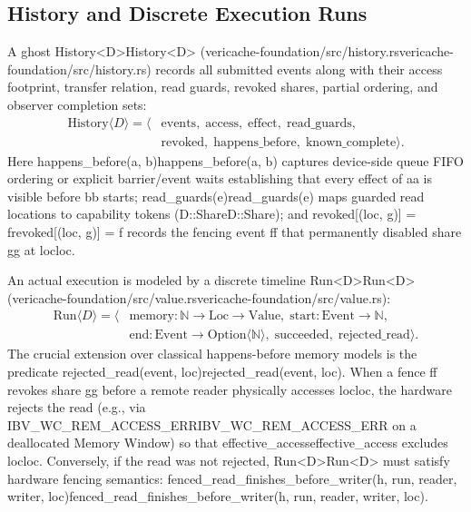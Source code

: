 \documentclass[11pt,a4paper]{article}
\let\origunderscore\_
\DeclareRobustCommand{\code}[1]{{\ttfamily\ifmmode #1\else\def\_{\origunderscore\hspace{0pt}}#1\fi}}
\begin{document}
\subsection{History and Discrete Execution Runs}

A ghost \code{History<D>} (\code{vericache-foundation/src/history.rs}) records all submitted events along with their access footprint, transfer relation, read guards, revoked shares, partial ordering, and observer completion sets:
\begin{align*}
  \mathrm{History}\langle D\rangle = \langle &\mathrm{events},\; \mathrm{access},\; \mathrm{effect},\; \mathrm{read\_guards}, \\
  &\mathrm{revoked},\; \mathrm{happens\_before},\; \mathrm{known\_complete} \rangle.
\end{align*}
Here \code{happens\_before(a, b)} captures device-side queue FIFO ordering or explicit barrier/event waits establishing that every effect of \code{a} is visible before \code{b} starts; \code{read\_guards(e)} maps guarded read locations to capability tokens (\code{D::Share}); and \code{revoked[(loc, g)] = f} records the fencing event \code{f} that permanently disabled share \code{g} at \code{loc}.

An actual execution is modeled by a discrete timeline \code{Run<D>} (\code{vericache-foundation/\allowbreak src/\allowbreak value.rs}):
\begin{align*}
  \mathrm{Run}\langle D\rangle = \langle &\mathrm{memory}: \mathbb{N} \to \mathrm{Loc} \to \mathrm{Value},\; \mathrm{start}: \mathrm{Event} \to \mathbb{N}, \\
  &\mathrm{end}: \mathrm{Event} \to \mathrm{Option}\langle\mathbb{N}\rangle,\; \mathrm{succeeded},\; \mathrm{rejected\_read} \rangle.
\end{align*}
The crucial extension over classical happens-before memory models is the predicate \code{rejected\_read(event, loc)}. When a fence \code{f} revokes share \code{g} before a remote reader physically accesses \code{loc}, the hardware rejects the read (e.g., via \code{IBV\_WC\_REM\_ACCESS\_ERR} on a deallocated Memory Window) so that \code{effective\_access} excludes \code{loc}. Conversely, if the read was not rejected, \code{Run<D>} must satisfy hardware fencing semantics: \code{fenced\_read\_finishes\_before\_writer(h, run, reader, writer, loc)}.
\end{document}
